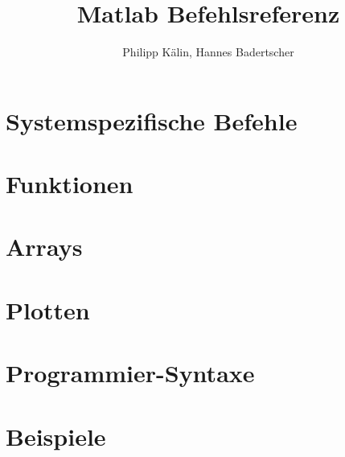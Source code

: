 \documentclass{article}
\title{Matlab Befehlsreferenz}
\author{Philipp Kälin, Hannes Badertscher}
\begin{document}
  

\section{Systemspezifische Befehle}
	

\section{Funktionen}
  
  

\section{Arrays}
  
  
\section{Plotten}
  
  
\section{Programmier-Syntaxe}
  

\section{Beispiele}
  
\end{document}
